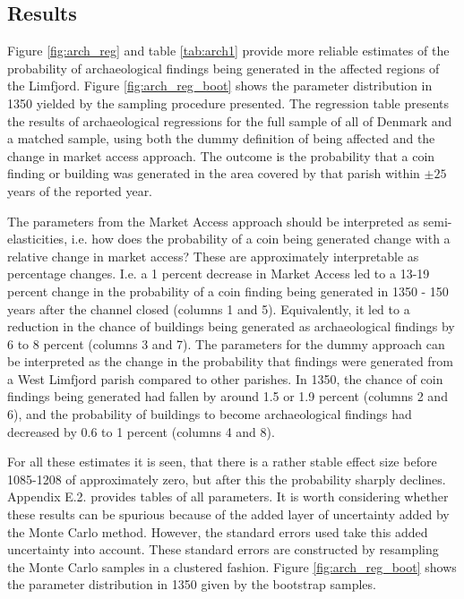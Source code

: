 \documentclass[11pt]{article}
\begin{document}
\FloatBarrier
\subsection{Results}

Figure \ref{fig:arch_reg} and table \ref{tab:arch1} provide more reliable estimates of the probability of archaeological findings being generated in the affected regions of the Limfjord. Figure \ref{fig:arch_reg_boot} shows the parameter distribution in 1350 yielded by the sampling procedure presented. The regression table presents the results of archaeological regressions for the full sample of all of Denmark and a matched sample, using both the dummy definition of being affected and the change in market access approach. The outcome is the probability that a coin finding or building was generated in the area covered by that parish within $\pm 25$ years of the reported year. 

The parameters from the Market Access approach should be interpreted as semi-elasticities, i.e. how does the probability of a coin being generated change with a relative change in market access? These are approximately interpretable as percentage changes. I.e. a 1 percent decrease in Market Access led to a 13-19 percent change in the probability of a coin finding being generated in 1350 - 150 years after the channel closed (columns 1 and 5). Equivalently, it led to a reduction in the chance of buildings being generated as archaeological findings by 6 to 8 percent (columns 3 and 7). The parameters for the dummy approach can be interpreted as the change in the probability that findings were generated from a West Limfjord parish compared to other parishes. In 1350, the chance of coin findings being generated had fallen by around 1.5 or 1.9 percent  (columns 2 and 6), and the probability of buildings to become archaeological findings had decreased by 0.6 to 1 percent (columns 4 and 8). 

For all these estimates it is seen, that there is a rather stable effect size before 1085-1208 of approximately zero, but after this the probability sharply declines. Appendix E.2. provides tables of all parameters. It is worth considering whether these results can be spurious because of the added layer of uncertainty added by the Monte Carlo method. However, the standard errors used take this added uncertainty into account. These standard errors are constructed by resampling the Monte Carlo samples in a clustered fashion. Figure \ref{fig:arch_reg_boot} shows the parameter distribution in 1350 given by the bootstrap samples.
\end{document}
